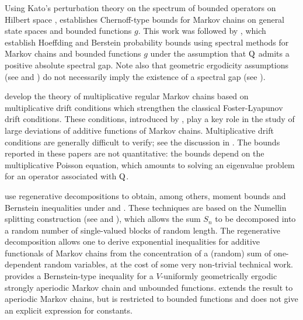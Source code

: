 \documentclass[sn-mathphys,Numbered]{sn-jnl}%
\begin{document}
Using Kato's perturbation theory on the spectrum of bounded operators on Hilbert space \cite{kato:2013}, \cite{lezaud:1998} establishes Chernoff-type bounds for Markov chains on general state spaces and bounded functions $g$. This work was followed by
\cite{paulin2015concentration,fan:jiang:sun:2018:hoeffding,fan:jiang:sun:2018:bernstein}, which establish Hoeffding and Berstein probability bounds using spectral methods for Markov chains and bounded functions $g$ under the assumption that ${\rm Q}$ admits a positive absolute spectral gap.
Note also that geometric ergodicity assumptions (see  and ) do not necessarily imply the existence of a spectral gap (see \cite{kontoyiannis2012geometric}).

\cite{kontoyiannis2003spectral,kontoyiannis2005large} develop the theory of multiplicative regular Markov chains based on multiplicative drift conditions which strengthen the classical Foster-Lyapunov drift conditions.
These conditions, introduced by \cite{varadhan:1984}, play a key role in the study of large deviations of additive functions of Markov chains. Multiplicative drift conditions are generally difficult to verify; see the discussion in \cite[Section~3.1]{adamczak2015exponential}. The bounds reported in these papers are not quantitative: the bounds depend on the multiplicative Poisson equation, which amounts to solving an eigenvalue problem for an operator associated with ${\rm Q}$.

\cite{clemenccon2001moment,bertail2010sharp,Adamczak2008,adamczak2015exponential,bertail2018new,lemanczyk2020general}
use regenerative decompositions to obtain, among others, moment bounds and Bernstein inequalities under  and .
These techniques are based on the Numellin splitting construction (see \cite{athreya1978new} and \cite{Nummelin1978AST}), which allows the sum $S_n$ to be decomposed into a random number of single-valued blocks of random length. The regenerative decomposition allows one to derive exponential inequalities for additive functionals of Markov chains from the concentration of a (random) sum of one-dependent random variables, at the cost of some very non-trivial technical work. \cite[Theorem~1]{adamczak2015exponential} provides a Bernstein-type inequality for a $V$-uniformly geometrically ergodic strongly aperiodic Markov chain and unbounded functions. \cite[Theorem~1]{lemanczyk2020general} extends the result to aperiodic Markov chains, but is restricted to bounded functions and does not give an explicit expression for constants.
\end{document}
